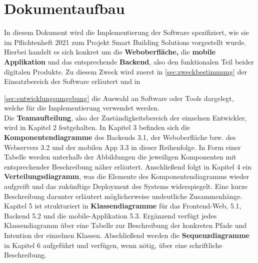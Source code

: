 \section{Dokumentaufbau}\label{sec:dokumentaufbau}
In diesem Dokument wird die Implementierung der Software spezifiziert,  wie sie im Pflichtenheft 2021 zum Projekt Smart Building Solutions vorgestellt wurde.  Hierbei handelt es sich konkret um die \textbf{Weboberfl\"ache,}  die \textbf{mobile Applikation} und das entsprechende \textbf{Backend},  also den funktionalen Teil beider digitalen Produkte.
Zu diesem Zweck wird zuerst in \ref{sec:zweckbestimmung} der Einsatzbereich der Software erl\"autert und in  {\ref{sec:entwicklungsumgebung} die Auswahl an Software oder Tools dargelegt,  welche f\"ur die Implementierung verwendet werden. \\
Die \textbf{Teamaufteilung},  also der Zust\"andigkeitsbereich der einzelnen Entwickler,  wird in Kapitel 2 festgehalten. 
In Kapitel 3 befinden sich die \textbf{Komponentendiagramme} des Backends 3.1,  der Weboberfl\"ache bzw.  des Webservers 3.2 und der mobilen App 3.3 in dieser Reihenfolge.  In Form einer Tabelle werden unterhalb der Abbildungen die jeweiligen Komponenten mit entsprechender Beschreibung n\"aher erl\"autert.
Anschlie{\ss}end folgt in Kapitel 4 ein \textbf{Verteilungsdiagramm},  was die Elemente des Komponentendiagramms wieder aufgreift und das zuk\"unftige Deployment des Systems widerspiegelt.  Eine kurze Beschreibung darunter erl\"autert m\"oglicherweise undeutliche Zusammenh\"ange.
Kapitel 5 ist strukturiert in \textbf{Klassendiagramme} f\"ur das Frontend-Web,  5.1,  Backend 5.2  und die mobile-Applikation 5.3.
Erg\"anzend verf\"ugt jedes Klassendiagramm \"uber eine Tabelle zur Beschreibung der konkreten Pfade und Intention der einzelnen Klassen.
Abschlie{\ss}end werden die \textbf{Sequenzdiagramme} in Kapitel 6 aufgef\"uhrt und verf\"ugen, wenn n\"otig, \"uber eine schriftliche Beschreibung.

\newpage
}

